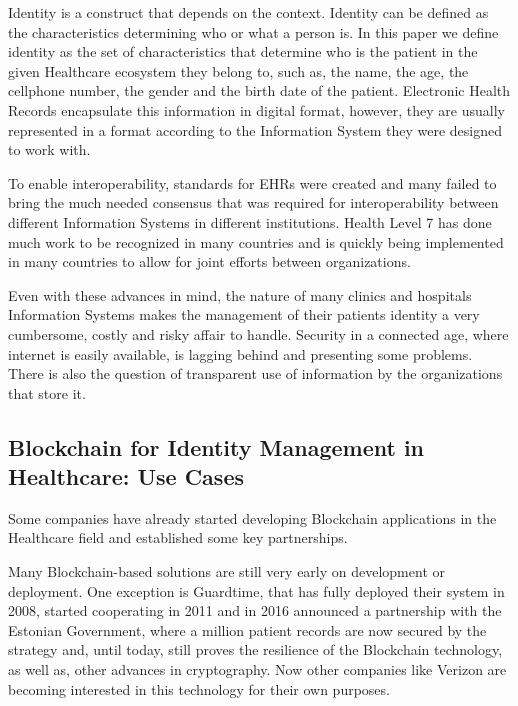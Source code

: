 \documentclass[]{llncs}
\begin{document}
Identity is a construct that depends on the context.  Identity can be defined
as the characteristics determining who or what a person is.  In this paper we
define identity as the set of characteristics that determine who is the patient
in the given Healthcare ecosystem they belong to, such as, the name, the age,
the cellphone number, the gender and the birth date of the patient.  Electronic
Health Records encapsulate this information in digital format, however, they
are usually represented in a format according to the Information System they
were designed to work with.

To enable interoperability, standards for EHRs were created and many failed to
bring the much needed consensus that was required for interoperability between
different Information Systems in different institutions.  Health Level 7 has
done much work to be recognized in many countries and is quickly being
implemented in many countries to allow for joint efforts between organizations.

Even with these advances in mind, the nature of many clinics and hospitals
Information Systems makes the management of their patients identity a very
cumbersome, costly and risky affair to handle.  Security in a connected age,
where internet is easily available, is lagging behind and presenting some
problems.  There is also the question of transparent use of information by the
organizations that store it.
%

\subsection{Blockchain for Identity Management in Healthcare: Use Cases} Some
companies have already started developing Blockchain applications in the
Healthcare field and established some key partnerships.

Many Blockchain-based solutions are still very early on development or
deployment.  One exception is Guardtime, that has fully deployed their system
in 2008, started cooperating in 2011 and in 2016 announced a partnership with
the Estonian Government, where a million patient records are now secured by the
strategy and, until today, still proves the resilience of the Blockchain
technology, as well as, other advances in cryptography.  Now other companies
like Verizon are becoming interested in this technology for their own purposes.
\cite{GuardTime2018,EstonianGovernmentGuardTime2016}
\end{document}
